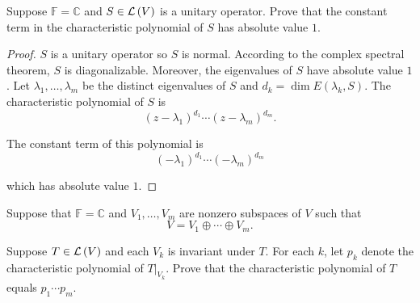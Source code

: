 \begin{exercise}\label{chapter8:sectionB:exercise19}
    Suppose $\mathbb{F} = \mathbb{C}$ and $S \in \mathcal{L}\left({V}\right)$ is a unitary operator. Prove that the constant term in the characteristic polynomial of $S$ has absolute value $1$.
\end{exercise}

\begin{proof}
    $S$ is a unitary operator so $S$ is normal. According to the complex spectral theorem, $S$ is diagonalizable. Moreover, the eigenvalues of $S$ have absolute value $1$. Let $\lambda_{1}, \ldots, \lambda_{m}$ be the distinct eigenvalues of $S$ and $d_{k} = \dim E(\lambda_{k}, S)$. The characteristic polynomial of $S$ is
    \[
        {(z - \lambda_{1})}^{d_{1}}\cdots {(z - \lambda_{m})}^{d_{m}}.
    \]

    The constant term of this polynomial is
    \[
        {(-\lambda_{1})}^{d_{1}}\cdots {(-\lambda_{m})}^{d_{m}}
    \]

    which has absolute value $1$.
\end{proof}
\newpage

\begin{exercise}\label{chapter8:sectionB:exercise20}
    Suppose that $\mathbb{F} = \mathbb{C}$ and $V_{1}, \ldots, V_{m}$ are nonzero subspaces of $V$ such that
    \[
        V = V_{1}\oplus \cdots \oplus V_{m}.
    \]

    Suppose $T\in\mathcal{L}\left({V}\right)$ and each $V_{k}$ is invariant under $T$. For each $k$, let $p_{k}$ denote the characteristic polynomial of $T\vert_{V_{k}}$. Prove that the characteristic polynomial of $T$ equals $p_{1}\cdots p_{m}$.
\end{exercise}


